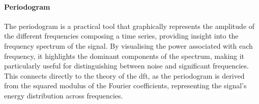 
\paragraph{Periodogram} The periodogram is a practical tool that graphically represents the amplitude of the different frequencies composing a time series, providing insight into the frequency spectrum of the signal. By visualising the power associated with each frequency, it highlights the dominant components of the spectrum, making it particularly useful for distinguishing between noise and significant frequencies. This connects directly to the theory of the \gls{dft}, as the periodogram is derived from the squared modulus of the Fourier coefficients, representing the signal's energy distribution across frequencies.

